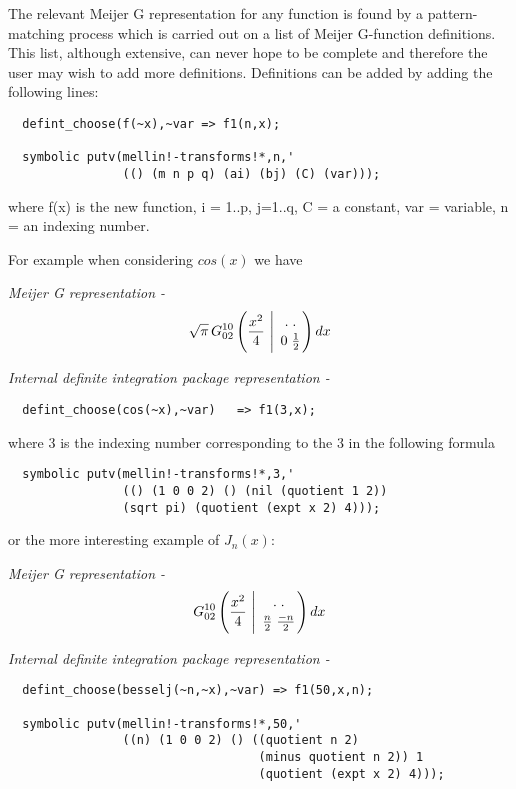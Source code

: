 The relevant Meijer G representation for any function is found by a 
pattern-matching process which is carried out on a list of Meijer 
G-function definitions. This list, although extensive, can never hope 
to be complete and therefore the user may wish to add more definitions.
Definitions can be added by adding the following lines:

\begin{verbatim}
  defint_choose(f(~x),~var => f1(n,x);

  symbolic putv(mellin!-transforms!*,n,'
                (() (m n p q) (ai) (bj) (C) (var)));

\end{verbatim} 
     where f(x) is the new function, i = 1..p, j=1..q, C = a constant,
     var = variable, n = an indexing number.

For example when considering $cos (x)$ we have

\it Meijer G representation  -  
\begin{displaymath}
\sqrt{\pi} \,G^{1 0}_{0 2}\left(\frac{x^{2}}{4} \ \Bigg\vert 
\ \MeijerGparams{ . \; . }{ 0 \; \frac{1}{2}} \right) dx 
\end{displaymath}

\it Internal definite integration package representation  - 
\begin{verbatim}
  defint_choose(cos(~x),~var)   => f1(3,x);
\end{verbatim}

\rm where 3 is the indexing number corresponding to the 3
in the following formula

\begin{verbatim}
  symbolic putv(mellin!-transforms!*,3,'
                (() (1 0 0 2) () (nil (quotient 1 2))
                (sqrt pi) (quotient (expt x 2) 4)));
\end{verbatim} 

or the more interesting example of $J_{n}(x)$:

\it Meijer G representation  -  
\begin{displaymath}
G^{1 0}_{0 2} \left(\frac{x^{2}}{4} \ \Bigg\vert 
\ \MeijerGparams{. \; .}{\frac{n}{2} \; {\frac{-n}{2}}} \right) dx 
\end{displaymath}

\it Internal definite integration package representation  - 

\begin{verbatim}
  defint_choose(besselj(~n,~x),~var) => f1(50,x,n);

  symbolic putv(mellin!-transforms!*,50,'
                ((n) (1 0 0 2) () ((quotient n 2)
                                   (minus quotient n 2)) 1
                                   (quotient (expt x 2) 4)));
\end{verbatim} 

